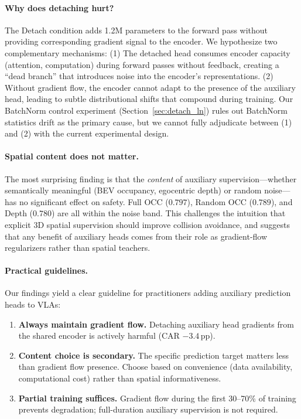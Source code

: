 \documentclass[letterpaper]{article}
\newcommand{\pp}{\,\textrm{pp}}
\begin{document}
\paragraph{Why does detaching hurt?}
The Detach condition adds 1.2M parameters to the forward pass without providing corresponding gradient signal to the encoder.
We hypothesize two complementary mechanisms:
(1) The detached head consumes encoder capacity (attention, computation) during forward passes without feedback, creating a ``dead branch'' that introduces noise into the encoder's representations.
(2) Without gradient flow, the encoder cannot adapt to the presence of the auxiliary head, leading to subtle distributional shifts that compound during training.
Our BatchNorm control experiment (Section~\ref{sec:detach_ln}) rules out BatchNorm statistics drift as the primary cause, but we cannot fully adjudicate between (1) and (2) with the current experimental design.

\paragraph{Spatial content does not matter.}
The most surprising finding is that the \emph{content} of auxiliary supervision---whether semantically meaningful (BEV occupancy, egocentric depth) or random noise---has no significant effect on safety.
Full OCC ($0.797$), Random OCC ($0.789$), and Depth ($0.780$) are all within the noise band.
This challenges the intuition that explicit 3D spatial supervision should improve collision avoidance, and suggests that any benefit of auxiliary heads comes from their role as gradient-flow regularizers rather than spatial teachers.

\paragraph{Practical guidelines.}
Our findings yield a clear guideline for practitioners adding auxiliary prediction heads to VLAs:
\begin{enumerate}
    \item \textbf{Always maintain gradient flow.} Detaching auxiliary head gradients from the shared encoder is actively harmful (CAR $-3.4\pp$).
    \item \textbf{Content choice is secondary.} The specific prediction target matters less than gradient flow presence. Choose based on convenience (data availability, computational cost) rather than spatial informativeness.
    \item \textbf{Partial training suffices.} Gradient flow during the first 30--70\% of training prevents degradation; full-duration auxiliary supervision is not required.
\end{enumerate}
\end{document}
